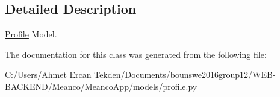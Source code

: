 \subsection{Detailed Description}
\hyperlink{class_meanco_app_1_1models_1_1profile_1_1_profile}{Profile} Model. 

The documentation for this class was generated from the following file\+:\begin{DoxyCompactItemize}
\item 
C\+:/\+Users/\+Ahmet Ercan Tekden/\+Documents/bounswe2016group12/\+W\+E\+B-\/\+B\+A\+C\+K\+E\+N\+D/\+Meanco/\+Meanco\+App/models/profile.\+py\end{DoxyCompactItemize}
